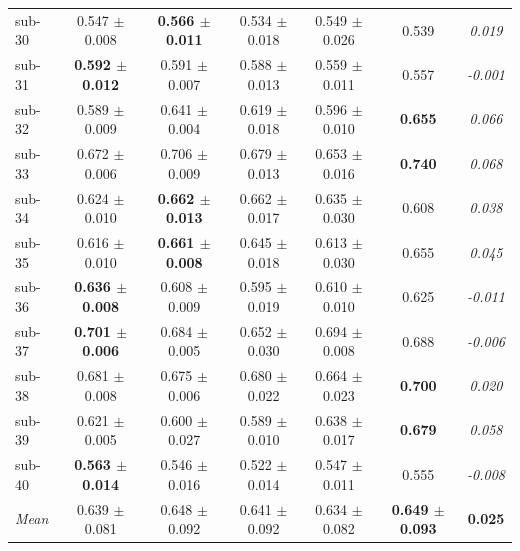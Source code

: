 \begin{table}[t]
\begin{tabular}{lcccccc}
sub-30 & 0.547 $\pm$ 0.008 & \textbf{0.566 $\pm$ 0.011} & 0.534 $\pm$ 0.018 & 0.549 $\pm$ 0.026 & 0.539 & \textit{0.019} \\
sub-31 & \textbf{0.592 $\pm$ 0.012} & 0.591 $\pm$ 0.007 & 0.588 $\pm$ 0.013 & 0.559 $\pm$ 0.011 & 0.557 & \textit{-0.001} \\
sub-32 & 0.589 $\pm$ 0.009 & 0.641 $\pm$ 0.004 & 0.619 $\pm$ 0.018 & 0.596 $\pm$ 0.010 & \textbf{0.655} & \textit{0.066} \\
sub-33 & 0.672 $\pm$ 0.006 & 0.706 $\pm$ 0.009 & 0.679 $\pm$ 0.013 & 0.653 $\pm$ 0.016 & \textbf{0.740} & \textit{0.068} \\
sub-34 & 0.624 $\pm$ 0.010 & \textbf{0.662 $\pm$ 0.013} & 0.662 $\pm$ 0.017 & 0.635 $\pm$ 0.030 & 0.608 & \textit{0.038} \\
sub-35 & 0.616 $\pm$ 0.010 & \textbf{0.661 $\pm$ 0.008} & 0.645 $\pm$ 0.018 & 0.613 $\pm$ 0.030 & 0.655 & \textit{0.045} \\
sub-36 & \textbf{0.636 $\pm$ 0.008} & 0.608 $\pm$ 0.009 & 0.595 $\pm$ 0.019 & 0.610 $\pm$ 0.010 & 0.625 & \textit{-0.011} \\
sub-37 & \textbf{0.701 $\pm$ 0.006} & 0.684 $\pm$ 0.005 & 0.652 $\pm$ 0.030 & 0.694 $\pm$ 0.008 & 0.688 & \textit{-0.006} \\
sub-38 & 0.681 $\pm$ 0.008 & 0.675 $\pm$ 0.006 & 0.680 $\pm$ 0.022 & 0.664 $\pm$ 0.023 & \textbf{0.700} & \textit{0.020} \\
sub-39 & 0.621 $\pm$ 0.005 & 0.600 $\pm$ 0.027 & 0.589 $\pm$ 0.010 & 0.638 $\pm$ 0.017 & \textbf{0.679} & \textit{0.058} \\
sub-40 & \textbf{0.563 $\pm$ 0.014} & 0.546 $\pm$ 0.016 & 0.522 $\pm$ 0.014 & 0.547 $\pm$ 0.011 & 0.555 & \textit{-0.008} \\
\midrule
\textit{Mean} & 0.639 $\pm$ 0.081 & 0.648 $\pm$ 0.092 & 0.641 $\pm$ 0.092 & 0.634 $\pm$ 0.082 & \textbf{0.649 $\pm$ 0.093} & \textbf{0.025} \\
\bottomrule
\end{tabular}
\end{table}

